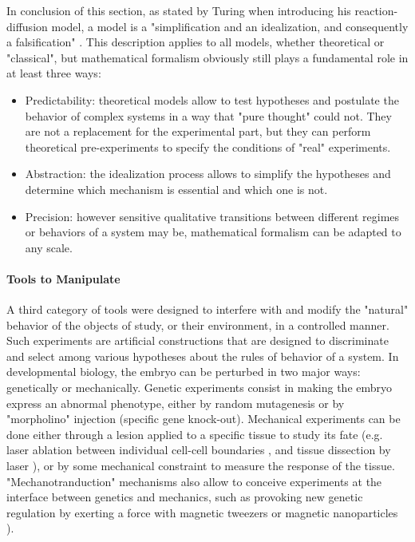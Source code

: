 In conclusion of this section, as stated by Turing when introducing his reaction-diffusion model, a model is a "simplification and an idealization, and consequently a falsification" \cite{Turing:1952vn}. This description applies to all models, whether theoretical or "classical", but mathematical formalism obviously still plays a fundamental role in at least three ways:
\begin{itemize}
	\item Predictability: theoretical models allow to test hypotheses and postulate the behavior of complex systems in a way that "pure thought" could not. They are not a replacement for the experimental part, but they can perform theoretical pre-experiments to specify the conditions of "real" experiments.
	\item Abstraction: the idealization process allows to simplify the hypotheses and determine which mechanism is essential and which one is not.
	\item Precision: however sensitive qualitative transitions between different regimes or behaviors of a system may be, mathematical formalism can be adapted to any scale.
\end{itemize}

\paragraph{Tools to Manipulate}


A third category of tools were designed to interfere with and modify the "natural" behavior of the objects of study, or their environment, in a controlled manner. Such experiments are artificial constructions that are designed to discriminate and select among various hypotheses about the rules of behavior of a system. In developmental biology, the embryo can be perturbed in two major ways: genetically or mechanically. Genetic experiments consist in making the embryo express an abnormal phenotype, either by random mutagenesis or by "morpholino" injection (specific gene knock-out). Mechanical experiments can be done either through a lesion applied to a specific tissue to study its fate (e.g. laser ablation between individual cell-cell boundaries \cite{FernandezGonzalez:2009hp}\cite{Landsberg:2009bp}, and tissue dissection by laser \cite{Behrndt:2012gy}), or by some mechanical constraint to measure the response of the tissue. "Mechanotranduction" mechanisms also allow to conceive experiments at the interface between genetics and mechanics, such as provoking new genetic regulation by exerting a force with magnetic tweezers or magnetic nanoparticles \cite{Desprat:2008ei}).


